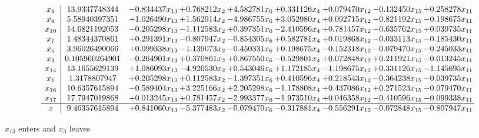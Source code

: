 \documentclass[10pt]{article}
\begin{document}
 \[\begin{array}{c| c c@{\hskip 2pt} c@{\hskip 2pt} c@{\hskip 2pt} c@{\hskip 2pt} c@{\hskip 2pt} c@{\hskip 2pt} c@{\hskip 2pt} }
 x_{8}   &  13.9337748344 & -0.834437 x_{13} & + 0.768212 x_{2} & + 4.582781 x_{6} & + 0.331126 x_{4} & + 0.079470 x_{12} & -0.132450 x_{15} & + 0.258278 x_{11}\\
 x_{9}   &  5.58940397351 & + 1.026490 x_{13} & + 1.562914 x_{2} & -4.986755 x_{6} & + 3.052980 x_{4} & + 0.092715 x_{12} & -0.821192 x_{15} & -0.198675 x_{11}\\
 x_{10}   &  14.6821192053 & -0.205298 x_{13} & -1.112583 x_{2} & + 0.397351 x_{6} & -2.410596 x_{4} & + 0.781457 x_{12} & -0.635762 x_{15} & + 0.039735 x_{11}\\
 x_{7}   &  1.48344370861 & + 0.291391 x_{13} & -0.807947 x_{2} & -0.854305 x_{6} & + 0.582781 x_{4} & + 0.019868 x_{12} & -0.033113 x_{15} & -0.185430 x_{11}\\
 x_{5}   &  3.96026490066 & + 0.099338 x_{13} & -1.139073 x_{2} & -0.450331 x_{6} & + 0.198675 x_{4} & -0.152318 x_{12} & -0.079470 x_{15} & -0.245033 x_{11}\\
 x_{3}   &  0.105960264901 & -0.264901 x_{13} & + 0.370861 x_{2} & + 0.867550 x_{6} & -0.529801 x_{4} & + 0.072848 x_{12} & + 0.211921 x_{15} & -0.013245 x_{11}\\
 x_{14}   &  13.1655629139 & + 1.086093 x_{13} & -4.920530 x_{2} & + 0.543046 x_{6} & + 1.172185 x_{4} & -1.198675 x_{12} & + 0.331126 x_{15} & -1.145695 x_{11}\\
 x_{1}   &  1.3178807947 & + 0.205298 x_{13} & + 0.112583 x_{2} & -1.397351 x_{6} & + 0.410596 x_{4} & + 0.218543 x_{12} & -0.364238 x_{15} & -0.039735 x_{11}\\
 x_{16}   &  10.6357615894 & -0.589404 x_{13} & + 3.225166 x_{2} & + 2.205298 x_{6} & -1.178808 x_{4} & + 0.437086 x_{12} & + 0.271523 x_{15} & -0.079470 x_{11}\\
 x_{17}   &  17.7947019868 & + 0.013245 x_{13} & + 0.781457 x_{2} & -2.993377 x_{6} & -1.973510 x_{4} & + 0.046358 x_{12} & -0.410596 x_{15} & -0.099338 x_{11}\\
\hline
z    &  9.46357615894 & + 0.841060 x_{13} & -5.377483 x_{2} & -0.079470 x_{6} & -0.317881 x_{4} & -0.556291 x_{12} & -0.072848 x_{15} & -0.807947 x_{11}\\
\end{array}\]


 $ x_{13} $ enters and $ x_{3} $ leaves 
\end{document}
